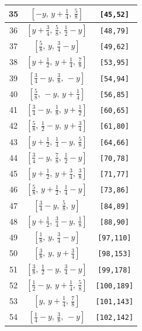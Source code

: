 \documentclass[fleqn,8pt]{jsarticle}
\begin{document}
\begin{longtable}{ccc}
35 & $\left[ - y,\, y + \frac{1}{4},\, \frac{5}{8} \right]$ & {\tt [45,52]} \\ \hline
36 & $\left[ y + \frac{3}{4},\, \frac{5}{8},\, \frac{1}{2} - y \right]$ & {\tt [48,79]} \\ \hline
37 & $\left[ \frac{5}{8},\, y,\, \frac{3}{4} - y \right]$ & {\tt [49,62]} \\ \hline
38 & $\left[ y + \frac{1}{2},\, y + \frac{1}{4},\, \frac{7}{8} \right]$ & {\tt [53,95]} \\ \hline
39 & $\left[ \frac{3}{4} - y,\, \frac{3}{8},\, - y \right]$ & {\tt [54,94]} \\ \hline
40 & $\left[ \frac{5}{8},\, - y,\, y + \frac{1}{4} \right]$ & {\tt [56,85]} \\ \hline
41 & $\left[ \frac{3}{4} - y,\, \frac{1}{8},\, y + \frac{1}{2} \right]$ & {\tt [60,65]} \\ \hline
42 & $\left[ \frac{5}{8},\, \frac{1}{2} - y,\, y + \frac{3}{4} \right]$ & {\tt [61,80]} \\ \hline
43 & $\left[ y + \frac{1}{2},\, \frac{1}{4} - y,\, \frac{5}{8} \right]$ & {\tt [64,66]} \\ \hline
44 & $\left[ \frac{3}{4} - y,\, \frac{7}{8},\, \frac{1}{2} - y \right]$ & {\tt [70,78]} \\ \hline
45 & $\left[ y + \frac{1}{2},\, y + \frac{3}{4},\, \frac{3}{8} \right]$ & {\tt [71,77]} \\ \hline
46 & $\left[ \frac{5}{8},\, y + \frac{1}{2},\, \frac{1}{4} - y \right]$ & {\tt [73,86]} \\ \hline
47 & $\left[ \frac{3}{4} - y,\, \frac{5}{8},\, y \right]$ & {\tt [84,89]} \\ \hline
48 & $\left[ y + \frac{1}{2},\, \frac{3}{4} - y,\, \frac{1}{8} \right]$ & {\tt [88,90]} \\ \hline
49 & $\left[ \frac{1}{8},\, y,\, \frac{3}{4} - y \right]$ & {\tt [97,110]} \\ \hline
50 & $\left[ \frac{3}{8},\, y,\, y + \frac{3}{4} \right]$ & {\tt [98,153]} \\ \hline
51 & $\left[ \frac{3}{8},\, \frac{1}{2} - y,\, \frac{3}{4} - y \right]$ & {\tt [99,178]} \\ \hline
52 & $\left[ \frac{1}{2} - y,\, y + \frac{1}{4},\, \frac{5}{8} \right]$ & {\tt [100,189]} \\ \hline
53 & $\left[ y,\, y + \frac{1}{4},\, \frac{7}{8} \right]$ & {\tt [101,143]} \\ \hline
54 & $\left[ \frac{1}{4} - y,\, \frac{3}{8},\, - y \right]$ & {\tt [102,142]} \\ \hline

\end{longtable}
\end{document}
